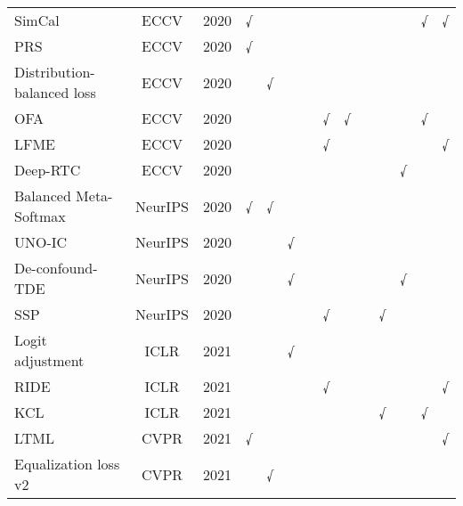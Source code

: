 \begin{table*}[htbp]
{\begin{tabular}{lccccccccccccc}
SimCal \cite{Wang_2020}  & ECCV  & 2020  & √     &       &       &       &       &       &       &       &       & √     & √ \\
PRS \cite{Kim_2020_im}  & ECCV  & 2020  & √     &       &       &       &       &       &       &       &       &       &  \\
Distribution-balanced loss \cite{Wu_2020_dist}  & ECCV  & 2020  &       & √     &       &       &       &       &       &       &       &       &  \\
OFA \cite{Chu_2020}  & ECCV  & 2020  &       &       &       &       & √     & √     &       &       &       & √     &  \\
LFME \cite{Xiang_2020} & ECCV  & 2020  &       &       &       &       & √     &       &       &       &       &       & √ \\
Deep-RTC \cite{Wu_2020_solv}  & ECCV  & 2020  &       &       &       &       &       &       &       &       & √     &       &  \\
Balanced Meta-Softmax \cite{ren2020balanced}  & NeurIPS & 2020  & √     & √     &       &       &       &       &       &       &       &       &  \\
UNO-IC \cite{tian2020posterior} & NeurIPS & 2020  &       &       & √     &       &       &       &       &       &       &       &  \\
De-confound-TDE \cite{tang2020long}  & NeurIPS & 2020  &       &       & √     &       &       &       &       &       & √     &       &  \\
SSP \cite{yang2020rethinking}  & NeurIPS & 2020  &       &       &       &       & √     &       &       & √     &       &       &  \\
Logit adjustment \cite{menon2020long}  & ICLR  & 2021  &       &       & √     &       &       &       &       &       &       &       &  \\
RIDE \cite{wang2020long}  & ICLR  & 2021  &       &       &       &       & √     &       &       &       &       &       & √ \\
KCL \cite{kang2020exploring}  & ICLR  & 2021  &       &       &       &       &       &       &       & √     &       & √     &  \\
LTML \cite{Guo_2021}  & CVPR  & 2021  & √     &       &       &       &       &       &       &       &       &       & √ \\
Equalization loss v2 \cite{Tan_2021}  & CVPR  & 2021  &       & √     &       &       &       &       &       &       &       &       &  \\

\end{tabular}}
\end{table*}
